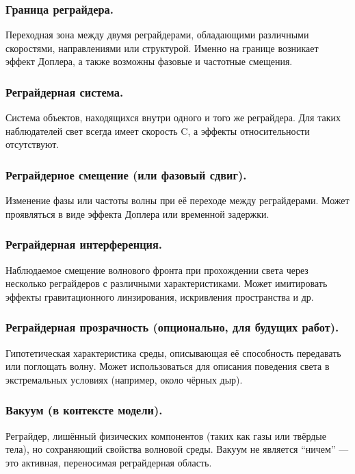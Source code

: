 \documentclass[12pt]{article}
\begin{document}
\subsubsection*{Граница реграйдера.}
Переходная зона между двумя реграйдерами, обладающими различными скоростями, направлениями или структурой. Именно на границе возникает эффект Доплера, а также возможны фазовые и частотные смещения.

\subsubsection*{Реграйдерная система.}
Система объектов, находящихся внутри одного и того же реграйдера. Для таких наблюдателей свет всегда имеет скорость C, а эффекты относительности отсутствуют.

\subsubsection*{Реграйдерное смещение (или фазовый сдвиг).}
Изменение фазы или частоты волны при её переходе между реграйдерами. Может проявляться в виде эффекта Доплера или временной задержки.

\subsubsection*{Реграйдерная интерференция.}
Наблюдаемое смещение волнового фронта при прохождении света через несколько реграйдеров с различными характеристиками. Может имитировать эффекты гравитационного линзирования, искривления пространства и др.

\subsubsection*{Реграйдерная прозрачность (опционально, для будущих работ).}
Гипотетическая характеристика среды, описывающая её способность передавать или поглощать волну. Может использоваться для описания поведения света в экстремальных условиях (например, около чёрных дыр).

\subsubsection*{Вакуум (в контексте модели).}
Реграйдер, лишённый физических компонентов (таких как газы или твёрдые тела), но сохраняющий свойства волновой среды. Вакуум не является “ничем” — это активная, переносимая реграйдерная область.
\end{document}
